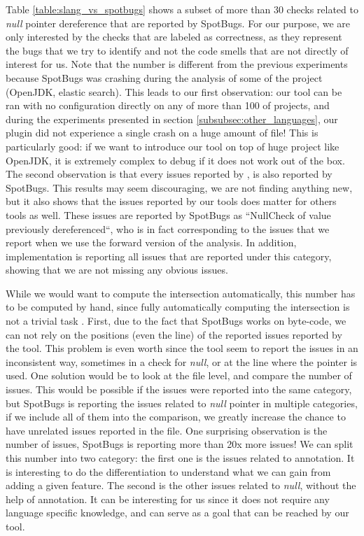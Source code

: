 Table \ref{table:slang_vs_spotbugs} shows a subset of more than 30 checks related to \emph{null} pointer dereference that are reported by SpotBugs. 
For our purpose, we are only interested by the checks that are labeled as correctness, as they represent the bugs that we try to identify and not the code smells that are not directly of interest for us. \newline
Note that the number is different from the previous experiments because SpotBugs was crashing during the analysis of some of the project (OpenJDK, elastic search). 
This leads to our first observation: our tool can be ran with no configuration directly on any of more than 100 of projects, and during the experiments presented in section \ref{subsubsec:other_languages}, our plugin did not experience a single crash on a huge amount of file!
This is particularly good: if we want to introduce our tool on top of huge project like OpenJDK, it is extremely complex to debug if it does not work out of the box.
The second observation is that every issues reported by \slang{}, is also reported by SpotBugs. 
This results may seem discouraging, we are not finding anything new, but it also shows that the issues reported by our tools does matter for others tools as well. 
These issues are reported by SpotBugs as “NullCheck of value previously dereferenced“, who is in fact corresponding to the issues that we report when we use the forward version of the analysis. 
In addition, \slang{} implementation is reporting all issues that are reported under this category, showing that we are not missing any obvious issues. \newline

While we would want to compute the intersection automatically, this number has to be computed by hand, since fully automatically computing the intersection is not a trivial task \cite{Gabel:2010:OIE:1806799.1806806}. 
First, due to the fact that SpotBugs works on byte-code, we can not rely on the positions (even the line) of the reported issues reported by the tool. 
This problem is even worth since the tool seem to report the issues in an inconsistent way, sometimes in a check for \emph{null}, or at the line where the pointer is used. 
One solution would be to look at the file level, and compare the number of issues. 
This would be possible if the issues were reported into the same category, but SpotBugs is reporting the issues related to \emph{null} pointer in multiple categories, if we include all of them into the comparison, we greatly increase the chance to have unrelated issues reported in the file. \newline
One surprising observation is the number of issues, SpotBugs is reporting more than 20x more issues! 
We can split this number into two category: the first one is the issues related to annotation. 
It is interesting to do the differentiation to understand what we can gain from adding a given feature. 
The second is the other issues related to \emph{null}, without the help of annotation. 
It can be interesting for us since it does not require any language specific knowledge, and can serve as a goal that can be reached by our tool.

